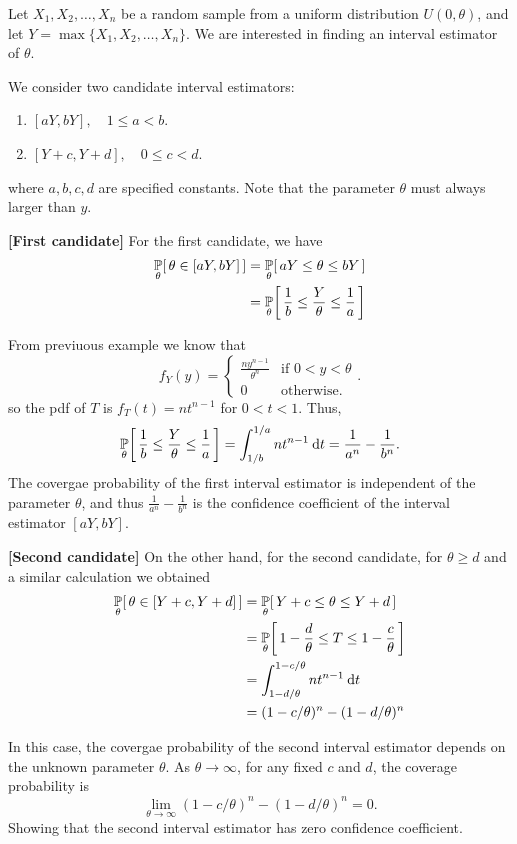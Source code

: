 \begin{example}
    Let $X_1, X_2, \ldots, X_n$ be a random sample from a uniform distribution $U(0, \theta)$, 
    and let $Y = \max\{ X_1, X_2, \ldots, X_n \}$. We are interested 
    in finding an interval estimator of $\theta$. 
    
    We consider two candidate interval estimators:
    \begin{enumerate}
        \item $[aY, bY], \quad 1 \leq a < b$.
        \item $[Y+c, Y+d], \quad 0 \leq c < d$.
    \end{enumerate}
    where $a, b, c, d$ are specified constants. Note that the parameter $\theta$ must always larger than $y$.

    \textbf{[First candidate]} For the first candidate, we have
    \begin{align*}
        \uprob[\theta]{ \theta \in [aY, bY] } &= \uprob[\theta]{ aY \leq \theta \leq bY } \\
        &= \uprob[\theta]{ \frac{1}{b} \leq \frac{Y}{\theta} \leq \frac{1}{a} }\\
    \end{align*}

    From previuous example we know that 
    \[
        f_Y(y) = \begin{cases}
            \displaystyle \frac{n y^{n-1}}{\theta^n} & \text{if } 0 < y < \theta \\
            0 & \text{otherwise.}
        \end{cases}.
    \]
    so the pdf of $T$ is $f_T(t) = nt^{n-1}$ for $0 < t < 1$. Thus,
    \[
        \uprob[\theta]{ \frac{1}{b} \leq \frac{Y}{\theta} \leq \frac{1}{a} }
        = \int_{1/b}^{1/a} nt^{n-1} \> \mathrm{d}t = \frac{1}{a^n} - \frac{1}{b^n}.
    \]
    The covergae probability of the first interval estimator is independent of the parameter $\theta$, and thus 
    $\frac{1}{a^n} - \frac{1}{b^n}$ is the confidence coefficient of the interval estimator $[aY, bY]$.

    \textbf{[Second candidate]} On the other hand, for the second candidate, for $\theta \geq d$ and a similar calculation we obtained
    \begin{align*}
        \uprob[\theta]{ \theta \in [Y+c, Y+d] } &= \uprob[\theta]{ Y + c \leq \theta \leq Y + d } \\
        &= \uprob[\theta]{ 1 - \frac{d}{\theta} \leq T \leq 1 - \frac{c}{\theta} } \\
        &= \int_{1 - d/\theta}^{1 - c/\theta} n t^{n-1} \> \mathrm{d}t \\
        &= (1 - c/\theta)^n - (1 - d/\theta)^n
    \end{align*}

    In this case, the covergae probability of the second interval estimator depends on the unknown parameter $\theta$.
    As $\theta \to \infty$, for any fixed $c$ and $d$, the coverage probability is 
    \[
        \lim_{\theta \to \infty} (1 - c/\theta)^n - (1 - d/\theta)^n = 0.
    \]
    Showing that the second interval estimator has zero confidence coefficient.
\end{example}


